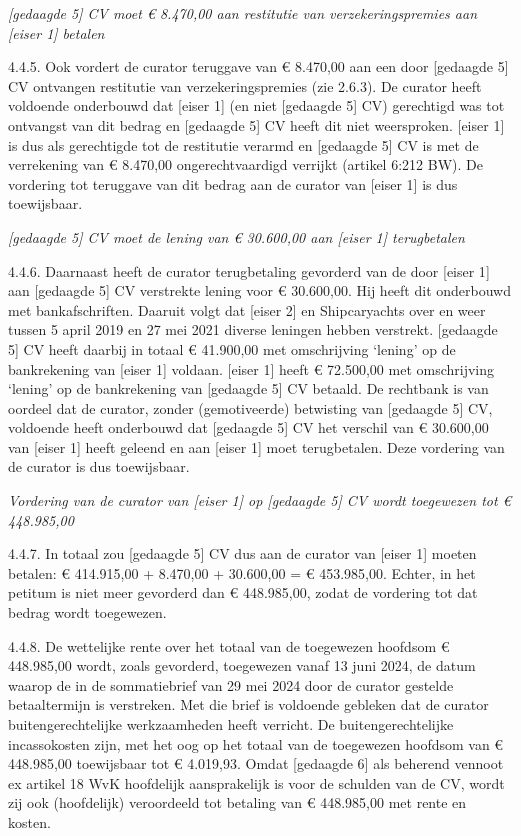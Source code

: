 \documentclass[
  dutch,
  a4paper,
]{article}
\begin{document}
\emph{{[}gedaagde 5{]} CV moet € 8.470,00 aan restitutie van verzekeringspremies aan {[}eiser 1{]} betalen}

4.4.5. Ook vordert de curator teruggave van € 8.470,00 aan een door {[}gedaagde 5{]} CV ontvangen restitutie van verzekeringspremies (zie 2.6.3). De curator heeft voldoende onderbouwd dat {[}eiser 1{]} (en niet {[}gedaagde 5{]} CV) gerechtigd was tot ontvangst van dit bedrag en {[}gedaagde 5{]} CV heeft dit niet weersproken. {[}eiser 1{]} is dus als gerechtigde tot de restitutie verarmd en {[}gedaagde 5{]} CV is met de verrekening van € 8.470,00 ongerechtvaardigd verrijkt (artikel 6:212 BW). De vordering tot teruggave van dit bedrag aan de curator van {[}eiser 1{]} is dus toewijsbaar.

\emph{{[}gedaagde 5{]} CV moet de lening van € 30.600,00 aan {[}eiser 1{]} terugbetalen}

4.4.6. Daarnaast heeft de curator terugbetaling gevorderd van de door {[}eiser 1{]} aan {[}gedaagde 5{]} CV verstrekte lening voor € 30.600,00. Hij heeft dit onderbouwd met bankafschriften. Daaruit volgt dat {[}eiser 2{]} en Shipcaryachts over en weer tussen 5 april 2019 en 27 mei 2021 diverse leningen hebben verstrekt. {[}gedaagde 5{]} CV heeft daarbij in totaal € 41.900,00 met omschrijving `lening' op de bankrekening van {[}eiser 1{]} voldaan. {[}eiser 1{]} heeft € 72.500,00 met omschrijving `lening' op de bankrekening van {[}gedaagde 5{]} CV betaald. De rechtbank is van oordeel dat de curator, zonder (gemotiveerde) betwisting van {[}gedaagde 5{]} CV, voldoende heeft onderbouwd dat {[}gedaagde 5{]} CV het verschil van € 30.600,00 van {[}eiser 1{]} heeft geleend en aan {[}eiser 1{]} moet terugbetalen. Deze vordering van de curator is dus toewijsbaar.

\emph{Vordering van de curator van {[}eiser 1{]} op {[}gedaagde 5{]} CV wordt toegewezen tot € 448.985,00}

4.4.7. In totaal zou {[}gedaagde 5{]} CV dus aan de curator van {[}eiser 1{]} moeten betalen: € 414.915,00 + 8.470,00 + 30.600,00 = € 453.985,00. Echter, in het petitum is niet meer gevorderd dan € 448.985,00, zodat de vordering tot dat bedrag wordt toegewezen.

4.4.8. De wettelijke rente over het totaal van de toegewezen hoofdsom € 448.985,00 wordt, zoals gevorderd, toegewezen vanaf 13 juni 2024, de datum waarop de in de sommatiebrief van 29 mei 2024 door de curator gestelde betaaltermijn is verstreken. Met die brief is voldoende gebleken dat de curator buitengerechtelijke werkzaamheden heeft verricht. De buitengerechtelijke incassokosten zijn, met het oog op het totaal van de toegewezen hoofdsom van € 448.985,00 toewijsbaar tot € 4.019,93. Omdat {[}gedaagde 6{]} als beherend vennoot ex artikel 18 WvK hoofdelijk aansprakelijk is voor de schulden van de CV, wordt zij ook (hoofdelijk) veroordeeld tot betaling van € 448.985,00 met rente en kosten.
\end{document}
